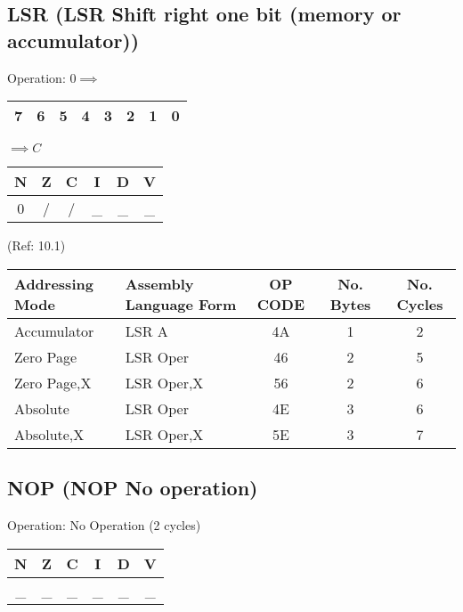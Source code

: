 \documentclass{article}
\begin{document}
  \subsection{LSR (LSR Shift right one bit (memory or accumulator))}

  Operation:  $0 \implies$ \begin{tabular}{|c|c|c|c|c|c|c|c|}\hline7&6&5&4&3&2&1&0\\\hline\end{tabular} $\implies C$
  \begin{table}[H]
  \centering
  \begin{tabular}{|c c c c c c|}
  \hline
  N&Z&C&I&D&V\\
  \hline
  0 & / & / & \_ & \_ & \_\\
  \hline
  \end{tabular}
  \end{table}
                                 (Ref: 10.1)
  \begin{table}[H]
  \centering
  \begin{tabular}{|l|l|c|c|c|}
  \hline
   Addressing Mode& Assembly Language Form& OP CODE &No. Bytes&No. Cycles\\
  \hline
    Accumulator   &   LSR A               &    4A   &    1    &    2     \\
    Zero Page     &   LSR Oper            &    46   &    2    &    5     \\
    Zero Page,X   &   LSR Oper,X          &    56   &    2    &    6     \\
    Absolute      &   LSR Oper            &    4E   &    3    &    6     \\
    Absolute,X    &   LSR Oper,X          &    5E   &    3    &    7     \\
  \hline
  \end{tabular}
  \end{table}

  \subsection{NOP (NOP No operation)}
  
  Operation:  No Operation (2 cycles)
  \begin{table}[H]
  \centering
  \begin{tabular}{|c c c c c c|}
  \hline
  N&Z&C&I&D&V\\
  \hline
  \_ & \_ & \_ & \_ & \_ & \_\\
  \hline
  \end{tabular}
  \end{table}
\end{document}
